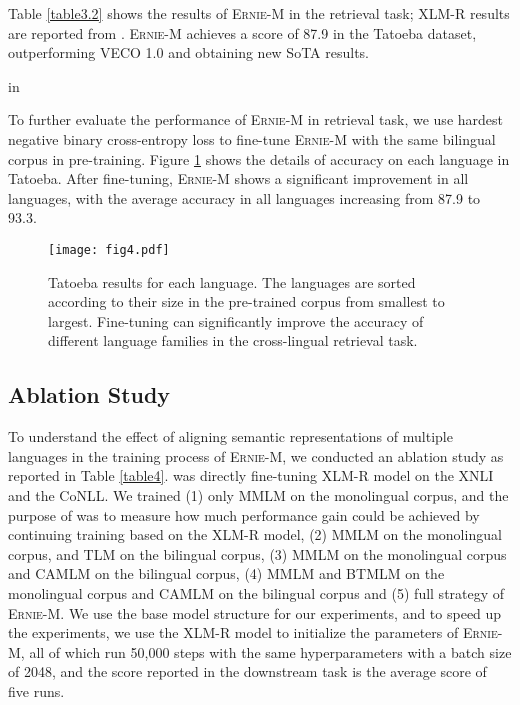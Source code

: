 \documentclass[11pt]{article}
\begin{document}
Table \ref{table3.2} shows the results of \textsc{Ernie-M} in the retrieval task; XLM-R results are reported from \citealt{luo2020veco}. \textsc{Ernie-M} achieves a score of 87.9 in the Tatoeba dataset, outperforming VECO 1.0 and obtaining new SoTA results. 

\begin{table}[!h]
\centering
\vskip 0.1in
\caption{Evaluation results on Tatoeba. ``'' indicates the results after fine-tuning.}
\label{table3.2}
 in
\end{table}

To further evaluate the performance of \textsc{Ernie-M} in retrieval task, we use hardest negative binary cross-entropy  loss \cite{wang2019camp,faghri2017vse++} to fine-tune \textsc{Ernie-M} with the same bilingual corpus in pre-training. Figure \ref{fig7} shows the details of accuracy on each language in Tatoeba. After fine-tuning, \textsc{Ernie-M} shows a significant improvement in all languages, with the average accuracy in all languages increasing from 87.9 to 93.3.

\begin{figure}[htp]
\centering
\texttt{[image: fig4.pdf]}
\caption{Tatoeba results for each language. The languages are sorted according to their size in the pre-trained corpus from smallest to largest. Fine-tuning can significantly improve the accuracy of different language families in the cross-lingual retrieval task.}
\label{fig7}
\vskip -0.1in
\end{figure}


\subsection{Ablation Study}
To understand the effect of aligning semantic representations of multiple languages in the training process of \textsc{Ernie-M}, we conducted an ablation study as reported in Table \ref{table4}.  was directly fine-tuning XLM-R model on the XNLI and the CoNLL. We trained (1) only MMLM on the monolingual corpus, and the purpose of  was to measure how much performance gain could be achieved by continuing training based on the XLM-R model, (2) MMLM on the monolingual corpus, and TLM on the bilingual corpus, (3) MMLM on the monolingual corpus and CAMLM on the bilingual corpus, (4) MMLM and BTMLM on the monolingual corpus and CAMLM on the bilingual corpus and (5) full strategy of \textsc{Ernie-M}. We use the base model structure for our experiments, and to speed up the experiments, we use the XLM-R model to initialize the parameters of \textsc{Ernie-M}, all of which run 50,000 steps with the same hyperparameters with a batch size of 2048, and the score reported in the downstream task is the average score of five runs.
\end{document}
